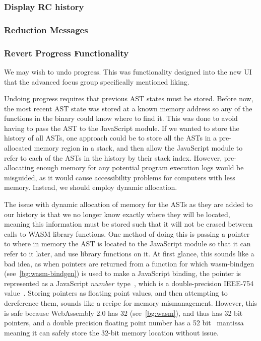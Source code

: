 \subsubsection{Display RC history}

\subsubsection{Reduction Messages}


\subsubsection{Revert Progress Functionality}
We may wish to undo progress. This was functionality designed into the new UI that the advanced focus group specifically mentioned liking. 

Undoing progress requires that previous \ac{AST} states must be stored. Before now, the most recent \ac{AST} state was stored at a known memory address so any of the functions in the binary could know where to find it. This was done to avoid having to pass the AST to the JavaScript module. If we wanted to store the history of all \ac{AST}s, one approach could be to store all the \ac{AST}s in a pre-allocated memory region in a stack, and then allow the JavaScript module to refer to each of the \ac{AST}s in the history by their stack index. However, pre-allocating enough memory for any potential program execution logs would be misguided, as it would cause accessibility problems for computers with less memory. Instead, we should employ dynamic allocation. 

The issue with dynamic allocation of memory for the \ac{AST}s as they are added to our history is that we no longer know exactly where they will be located, meaning this information must be stored such that it will not be erased between calls to \ac{WASM} library functions. One method of doing this is passing a pointer to where in memory the AST is located to the JavaScript module so that it can refer to it later, and use library functions on it. At first glance, this sounds like a bad idea, as when pointers are returned from a function for which wasm-bindgen (see~\ref{bg:wasm-bindgen}) is used to make a JavaScript binding, the pointer is represented as a JavaScript $number$ type~\cite{wasm_bindgen_guide}, which is a double-precision IEEE-754 value~\cite{ecma262number}. Storing pointers as floating point values, and then attempting to dereference them, sounds like a recipe for memory mismanagement. However, this is safe because WebAssembly 2.0 has 32 (see~\ref{bg:wasm}), and thus has 32 bit pointers, and a double precision floating point number has a 52 bit~\cite{ieee754} mantissa meaning it can safely store the 32-bit memory location without issue. 

